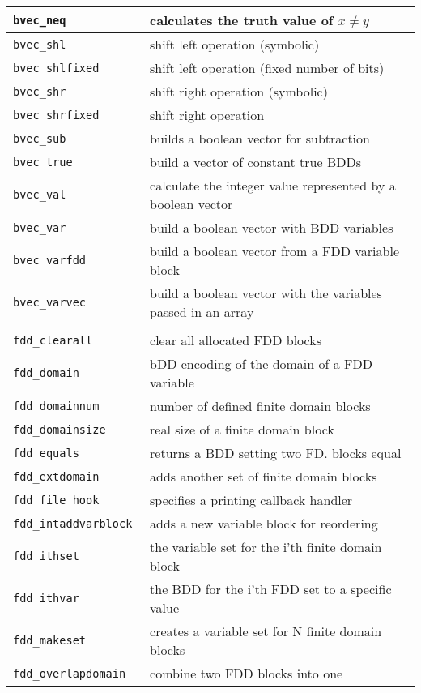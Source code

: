 \begin{supertabular}{|l|l|}
{\tt bvec\_neq } & calculates the truth value of $x \neq y$  \\\hline
{\tt bvec\_shl } & shift left operation (symbolic)  \\\hline
{\tt bvec\_shlfixed } & shift left operation (fixed number of bits)  \\\hline
{\tt bvec\_shr } & shift right operation (symbolic)  \\\hline
{\tt bvec\_shrfixed } & shift right operation  \\\hline
{\tt bvec\_sub } & builds a boolean vector for subtraction  \\\hline
{\tt bvec\_true } & build a vector of constant true BDDs  \\\hline
{\tt bvec\_val } & calculate the integer value represented by a boolean vector  \\\hline
{\tt bvec\_var } & build a boolean vector with BDD variables  \\\hline
{\tt bvec\_varfdd } & build a boolean vector from a FDD variable block  \\\hline
{\tt bvec\_varvec } & build a boolean vector with the variables passed in an array  \\\hline
{} \\ \hline
{\tt fdd\_clearall } & clear all allocated FDD blocks  \\\hline
{\tt fdd\_domain } & bDD encoding of the domain of a FDD variable  \\\hline
{\tt fdd\_domainnum } & number of defined finite domain blocks  \\\hline
{\tt fdd\_domainsize } & real size of a finite domain block  \\\hline
{\tt fdd\_equals } & returns a BDD setting two FD. blocks equal  \\\hline
{\tt fdd\_extdomain } & adds another set of finite domain blocks  \\\hline
{\tt fdd\_file\_hook } & specifies a printing callback handler  \\\hline
{\tt fdd\_intaddvarblock } & adds a new variable block for reordering  \\\hline
{\tt fdd\_ithset } & the variable set for the i'th finite domain block  \\\hline
{\tt fdd\_ithvar } & the BDD for the i'th FDD set to a specific value  \\\hline
{\tt fdd\_makeset } & creates a variable set for N finite domain blocks  \\\hline
{\tt fdd\_overlapdomain } & combine two FDD blocks into one  \\\hline

\end{supertabular}
